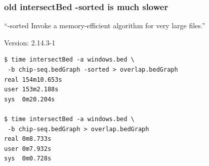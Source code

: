 \documentclass{beamer}
\begin{document}
\begin{frame}[fragile]
  \frametitle{old intersectBed -sorted is much slower}

  ``-sorted Invoke a memory-efficient algorithm for very large files.''

Version: 2.14.3-1


\begin{verbatim}
$ time intersectBed -a windows.bed \
 -b chip-seq.bedGraph -sorted > overlap.bedGraph
real 154m10.653s
user 153m2.188s
sys  0m20.204s

$ time intersectBed -a windows.bed \
 -b chip-seq.bedGraph > overlap.bedGraph
real 0m8.733s
user 0m7.932s
sys  0m0.728s
\end{verbatim}


  
\end{frame}
\end{document}
